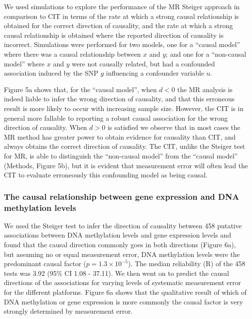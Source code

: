 \documentclass[]{article}
\begin{document}
We used simulations to explore the performance of the MR Steiger
approach in comparison to CIT in terms of the rate at which a strong
causal relationship is obtained for the correct direction of causality,
and the rate at which a strong causal relationship is obtained where the
reported direction of causality is incorrect. Simulations were performed
for two models, one for a ``causal model'' where there was a causal
relationship between \(x\) and \(y\); and one for a ``non-causal model''
where \(x\) and \(y\) were not causally related, but had a confounded
association induced by the SNP \(g\) influencing a confounder variable
\(u\).

Figure 5a shows that, for the ``causal model'', when \(d < 0\) the MR
analysis is indeed liable to infer the wrong direction of causality, and
that this erroneous result is more likely to occur with increasing
sample size. However, the CIT is in general more fallable to reporting a
robust causal association for the wrong direction of causality. When
\(d > 0\) is satisfied we observe that in most cases the MR method has
greater power to obtain evidence for causality than CIT, and always
obtains the correct direction of causality. The CIT, unlike the Steiger
test for MR, is able to distinguish the ``non-causal model'' from the
``causal model'' (Methods, Figure 5b), but it is evident that
measurement error will often lead the CIT to evaluate erroneously this
confounding model as being causal.

\subsubsection{The causal relationship between gene expression and DNA
methylation
levels}\label{the-causal-relationship-between-gene-expression-and-dna-methylation-levels}

We used the Steiger test to infer the direction of causality between 458
putative associations between DNA methylation levels and gene expression
levels and found that the causal direction commonly goes in both
directions (Figure 6a), but assuming no or equal measurement error, DNA
methylation levels were the predominant causal factor
(\(p = 1.3\times 10^{-5}\)). The median reliability (R) of the 458 tests
was 3.92 (95\% CI 1.08 - 37.11). We then went on to predict the causal
directions of the associations for varying levels of systematic
measurement error for the different platforms. Figure 6a shows that the
qualitative result of which of DNA methylation or gene expression is
more commonly the causal factor is very strongly determined by
measurement error.
\end{document}
